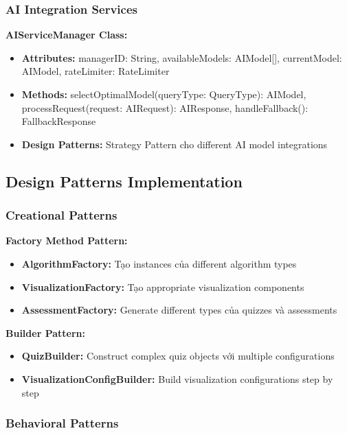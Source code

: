 \subsubsection{AI Integration Services}

\textbf{AIServiceManager Class:}
\begin{itemize}
    \item \textbf{Attributes:} managerID: String, availableModels: AIModel[], currentModel: AIModel, rateLimiter: RateLimiter
    \item \textbf{Methods:} selectOptimalModel(queryType: QueryType): AIModel, processRequest(request: AIRequest): AIResponse, handleFallback(): FallbackResponse
    \item \textbf{Design Patterns:} Strategy Pattern cho different AI model integrations
\end{itemize}

\subsection{Design Patterns Implementation}
\label{subsec:design-patterns}

\subsubsection{Creational Patterns}

\textbf{Factory Method Pattern:}
\begin{itemize}
    \item \textbf{AlgorithmFactory:} Tạo instances của different algorithm types
    \item \textbf{VisualizationFactory:} Tạo appropriate visualization components
    \item \textbf{AssessmentFactory:} Generate different types của quizzes và assessments
\end{itemize}

\textbf{Builder Pattern:}
\begin{itemize}
    \item \textbf{QuizBuilder:} Construct complex quiz objects với multiple configurations
    \item \textbf{VisualizationConfigBuilder:} Build visualization configurations step by step
\end{itemize}

\subsubsection{Behavioral Patterns}

